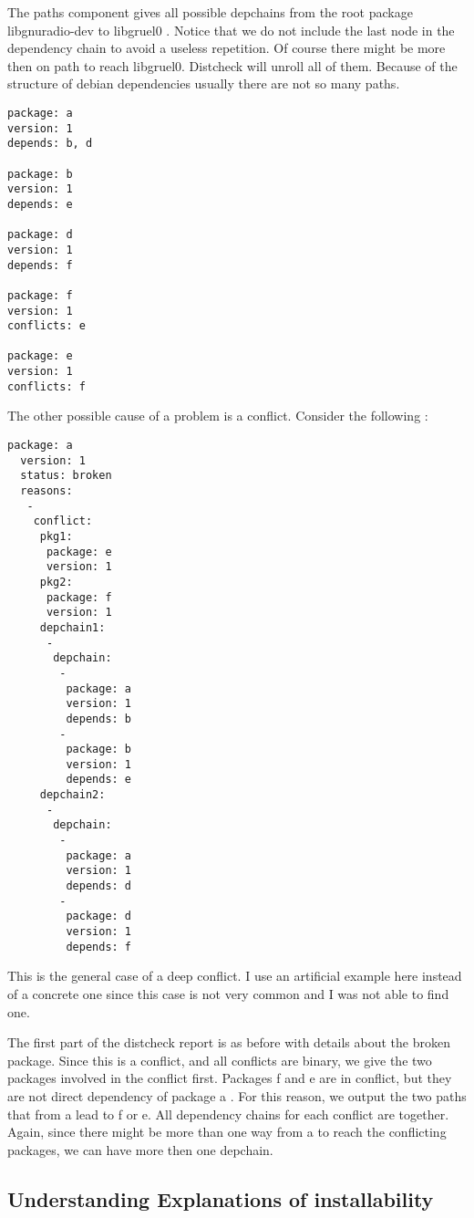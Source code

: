 The paths component gives all possible depchains from the root package
libgnuradio-dev to libgruel0 . Notice that we do not include the last node in
the dependency chain to avoid a useless repetition. Of course there might be
more then on path to reach libgruel0. Distcheck will unroll all of them.
Because of the structure of debian dependencies usually there are not so many
paths.

\begin{verbatim}
package: a
version: 1
depends: b, d

package: b
version: 1
depends: e

package: d
version: 1
depends: f

package: f
version: 1
conflicts: e

package: e
version: 1
conflicts: f
\end{verbatim}

The other possible cause of a problem is a conflict. Consider the following :

\begin{verbatim}
package: a
  version: 1
  status: broken
  reasons:
   -
    conflict:
     pkg1:
      package: e
      version: 1
     pkg2:
      package: f
      version: 1
     depchain1:
      -
       depchain:
        -
         package: a
         version: 1
         depends: b
        -
         package: b
         version: 1
         depends: e
     depchain2:
      -
       depchain:
        -
         package: a
         version: 1
         depends: d
        -
         package: d
         version: 1
         depends: f
\end{verbatim}

This is the general case of a deep conflict. I use an artificial example here
instead of a concrete one since this case is not very common and I was not able
to find one.

The first part of the distcheck report is as before with details about the
broken package. Since this is a conflict, and all conflicts are binary, we give
the two packages involved in the conflict first. Packages f and e are in
conflict, but they are not direct dependency of package a . For this reason, we
output the two paths that from a lead to f or e. All dependency chains for each
conflict are together. Again, since there might be more than one way from a to
reach the conflicting packages, we can have more then one depchain. 

\subsection{Understanding Explanations of installability}


